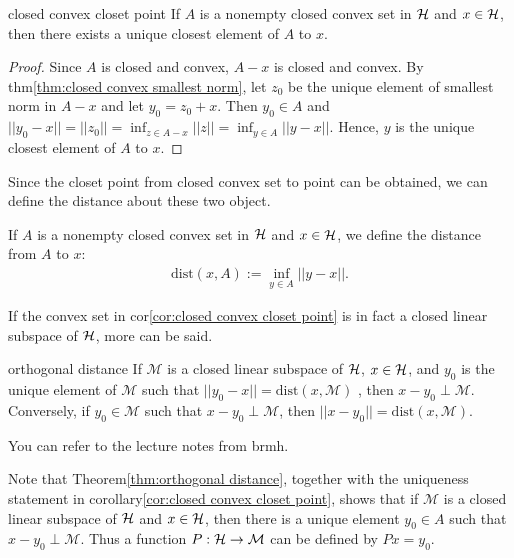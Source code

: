 \begin{corollary}{}{closed convex closet point}
    If $A$ is a nonempty closed convex set in $\mathcal{H}$ and $x\in \mathcal{H}$, then there exists a unique closest element of $A$ to $x$.
\end{corollary}
\begin{proof}
    Since $A$ is closed and convex, $A-x$ is closed and convex. By thm\ref{thm:closed convex smallest norm}, let $z_0$ be the unique element of smallest norm in $A-x$
    and let $y_0=z_0+x$. Then $y_0\in A$ and $||y_0-x||=||z_0||=\inf_{z\in A-x}||z|| = \inf_{y\in A} ||y-x||$. 
    Hence, $y$ is the unique closest element of $A$ to $x$. 
\end{proof}

Since the closet point from closed convex set to point can be obtained, we can define the distance about these two object.

\begin{definition}{}{}
    If $A$ is a nonempty closed convex set in $\mathcal{H}$ and $x\in \mathcal{H}$, we define the distance from $A$ to $x$:
    \begin{align*}
        \text{dist}(x,A):= \inf_{y\in A}||y-x||.
    \end{align*}
\end{definition}


If the convex set in cor\ref{cor:closed convex closet point} is in fact a closed linear subspace 
of $\mathcal{H}$, more can be said.

\begin{theorem}{}{orthogonal distance}
    If $\mathcal{M}$ is a closed linear subspace of $\mathcal{H}$, $x\in \mathcal{H}$, and $y_0$ is the unique element of $\mathcal{M}$ such that $||y_0-x|| =\text{dist}(x,\mathcal{M})$ , then $x-y_0\perp \mathcal{M}$. 
    Conversely, if $y_0\in\mathcal{M}$ such that $x-y_0\perp\mathcal{M}$, then $||x-y_0||=\text{dist}(x,\mathcal{M})$.
\end{theorem}

\begin{proofsolution}
    You can refer to the lecture notes from brmh.
\end{proofsolution}



Note that Theorem\ref{thm:orthogonal distance}, together with the uniqueness statement in 
corollary\ref{cor:closed convex closet point}, shows that if $\mathcal{M}$ is a closed linear subspace of $\mathcal{H}$ and $x\in \mathcal{H}$, 
then there is a unique element $y_0\in A$ such that $x -y_0\perp \mathcal{M}$. Thus a function 
$P: \mathcal{H}\rightarrow \mathcal{M}$ can be defined by $Px = y_0$.


